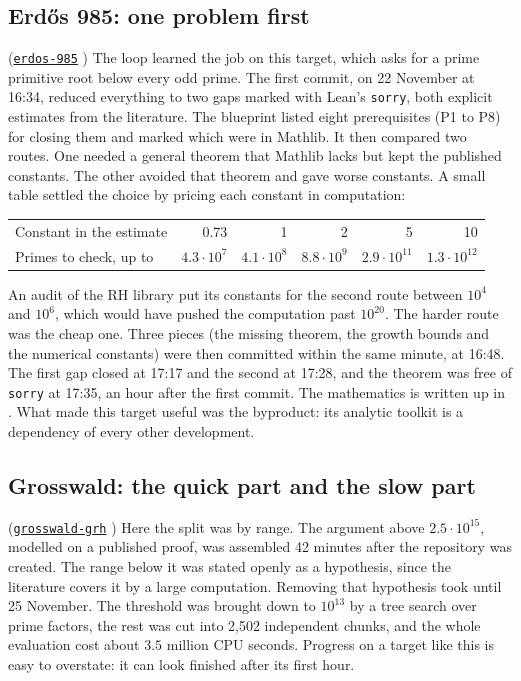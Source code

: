 \documentclass[11pt]{amsart}
\newcommand{\lean}[1]{\texttt{#1}}
\newcommand{\repo}[1]{\href{https://github.com/senamakel/#1}{\texttt{#1}}}
\begin{document}
\subsection*{Erd\H{o}s 985: one problem first} \textup{(\repo{erdos-985} \cite{r-erdos-985})} The loop learned the job on this target, which asks for a prime primitive root below every odd prime. The first commit, on 22 November at 16:34, reduced everything to two gaps marked with Lean's \lean{sorry}, both explicit estimates from the literature. The blueprint listed eight prerequisites (P1 to P8) for closing them and marked which were in Mathlib. It then compared two routes. One needed a general theorem that Mathlib lacks but kept the published constants. The other avoided that theorem and gave worse constants. A small table settled the choice by pricing each constant in computation:
\begin{center}
\small
\begin{tabular}{@{}lrrrrr@{}}
\toprule
Constant in the estimate & 0.73 & 1 & 2 & 5 & 10\\
Primes to check, up to & $4.3\cdot10^7$ & $4.1\cdot10^8$ & $8.8\cdot10^9$ & $2.9\cdot10^{11}$ & $1.3\cdot10^{12}$\\
\bottomrule
\end{tabular}
\end{center}
An audit of the RH library put its constants for the second route between $10^4$ and $10^6$, which would have pushed the computation past $10^{20}$. The harder route was the cheap one. Three pieces (the missing theorem, the growth bounds and the numerical constants) were then committed within the same minute, at 16:48. The first gap closed at 17:17 and the second at 17:28, and the theorem was free of \lean{sorry} at 17:35, an hour after the first commit. The mathematics is written up in \cite{paper985}. What made this target useful was the byproduct: its analytic toolkit is a dependency of every other development.

\subsection*{Grosswald: the quick part and the slow part} \textup{(\repo{grosswald-grh} \cite{r-grosswald-grh})} Here the split was by range. The argument above $2.5\cdot10^{15}$, modelled on a published proof, was assembled 42 minutes after the repository was created. The range below it was stated openly as a hypothesis, since the literature covers it by a large computation. Removing that hypothesis took until 25 November. The threshold was brought down to $10^{13}$ by a tree search over prime factors, the rest was cut into 2{,}502 independent chunks, and the whole evaluation cost about $3.5$ million CPU seconds. Progress on a target like this is easy to overstate: it can look finished after its first hour.
\end{document}
